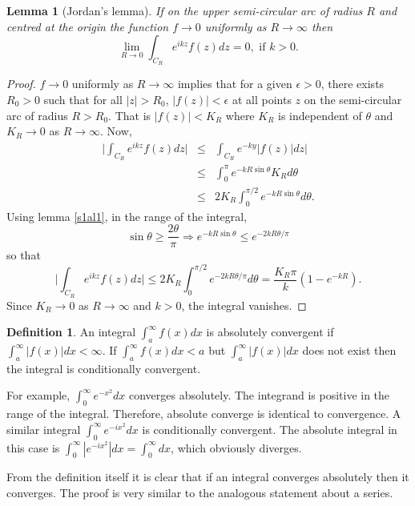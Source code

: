 \documentclass{article}
\theoremstyle{plain}
\numberwithin{thm}{section}
\theoremstyle{plain}
\numberwithin{prop}{section}
\theoremstyle{plain}
\newtheorem{lem}{Lemma}
\numberwithin{prop}{section}
\theoremstyle{definition}
\newtheorem{defn}{Definition}
\numberwithin{defn}{section}
\theoremstyle{remark}
\numberwithin{equation}{section}
\begin{document}
\begin{lem}[Jordan's lemma]\label{s4l1}
If on the upper semi-circular arc of radius $R$ and centred at the origin the
function $f \rightarrow 0$ uniformly as $R \rightarrow \infty$ then
\[
\lim_{R \rightarrow 0}\int_{C_R}e^{ikz}f(z)dz = 0, \text{ if } k > 0.
\]
\end{lem}
\begin{proof}

$f \rightarrow 0$ uniformly as $R \rightarrow \infty$ implies that for a 
given $\epsilon > 0$, there exists $R_0 > 0$ such that for all $|z| > R_0$,
$|f(z)| < \epsilon$ at all points $z$ on the semi-circular arc of radius $R >
R_0$. That is $|f(z)| < K_R$ where $K_R$ is independent of $\theta$ and 
$K_R \rightarrow 0$ as $R \rightarrow \infty$. Now,
\begin{eqnarray*}
\Big|\int_{C_R}e^{ikz}f(z)dz\Big| &\le& \int_{C_R}e^{-ky}|f(z)|dz| \\
 &\le& \int_0^\pi e^{-kR\sin\theta}K_R d\theta \\
 &\le& 2K_R\int_0^{\pi/2}e^{-kR\sin\theta} d\theta.
\end{eqnarray*}
Using lemma \ref{s1al1}, in the range of the integral,
\[
\sin\theta \ge \frac{2\theta}{\pi} \Rightarrow e^{-kR\sin\theta} \le
e^{-2kR\theta/\pi}
\]
so that
\[
\Big|\int_{C_R}e^{ikz}f(z)dz\Big| \le 2K_R\int_0^{\pi/2}e^{-2kR\theta/\pi}d
\theta = \frac{K_R\pi}{k}\left(1 - e^{-kR}\right).
\]
Since $K_R \rightarrow 0$ as $R \rightarrow \infty$ and $k > 0$, the integral 
vanishes.
\end{proof}

\begin{defn}\label{c4d1}
An integral $\int_a^\infty f(x)dx$ is absolutely convergent if $\int_a^\infty
|f(x)|dx < \infty$. If $\int_a^\infty f(x)dx < a$ but $\int_a^\infty |f(x)|dx$
does not exist then the integral is conditionally convergent.
\end{defn}

For example, $\int_0^\infty e^{-x^2}dx$ converges absolutely. The integrand is
positive in the range of the integral. Therefore, absolute converge is 
identical to convergence. A similar integral $\int_0^\infty e^{-ix^2}dx$ is
conditionally convergent. The absolute integral in this case is $\int_0^\infty
|e^{-ix^2}|dx = \int_0^\infty dx$, which obviously diverges.

From the definition itself it is clear that if an integral converges absolutely
then it converges. The proof is very similar to the analogous statement about
a series.
\end{document}

